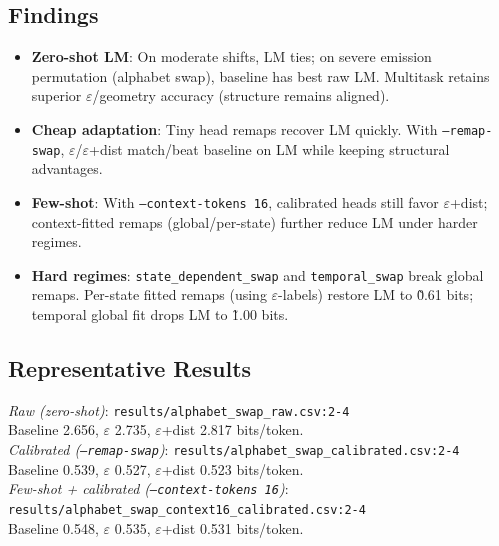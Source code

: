 \documentclass[11pt]{article}
\begin{document}
\subsection{Findings}
\begin{resultbox}[Summary]
\vspace{-0.5em}
\begin{itemize}
  \item \textbf{Zero-shot LM}: On moderate shifts, LM ties; on severe emission permutation (alphabet swap), baseline has best raw LM. Multitask retains superior $\varepsilon$/geometry accuracy (structure remains aligned).
  \item \textbf{Cheap adaptation}: Tiny head remaps recover LM quickly. With \texttt{--remap-swap}, $\varepsilon$/$\varepsilon$+dist match/beat baseline on LM while keeping structural advantages.
  \item \textbf{Few-shot}: With \texttt{--context-tokens 16}, calibrated heads still favor $\varepsilon$+dist; context-fitted remaps (global/per-state) further reduce LM under harder regimes.
  \item \textbf{Hard regimes}: \texttt{state\_dependent\_swap} and \texttt{temporal\_swap} break global remaps. Per-state fitted remaps (using $\varepsilon$-labels) restore LM to \~0.61 bits; temporal global fit drops LM to \~1.00 bits.
\end{itemize}
\vspace{-0.5em}
\end{resultbox}

\subsection{Representative Results}
\begin{notebox}
\textit{Raw (zero-shot)}: \texttt{results/alphabet\_swap\_raw.csv:2-4} \\
Baseline 2.656, $\varepsilon$ 2.735, $\varepsilon$+dist 2.817 bits/token.\\
\textit{Calibrated (\texttt{--remap-swap})}: \texttt{results/alphabet\_swap\_calibrated.csv:2-4} \\
Baseline 0.539, $\varepsilon$ 0.527, $\varepsilon$+dist 0.523 bits/token.\\
\textit{Few-shot + calibrated (\texttt{--context-tokens 16})}: \texttt{results/alphabet\_swap\_context16\_calibrated.csv:2-4} \\
Baseline 0.548, $\varepsilon$ 0.535, $\varepsilon$+dist 0.531 bits/token.
\end{notebox}
\end{document}
